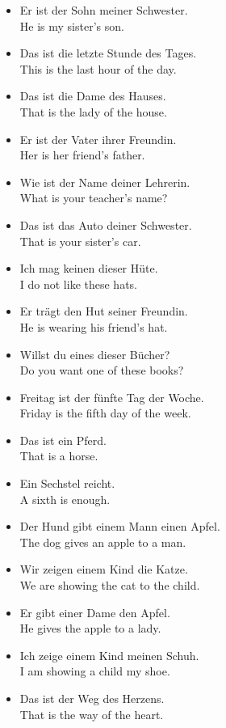 \begin{itemize}
  \item  Er ist der Sohn meiner Schwester. \\ He is my sister's son.
	\item  Das ist die letzte Stunde des Tages. \\ This is the last hour of the day.
	\item  Das ist die Dame des Hauses. \\ That is the lady of the house.
	\item  Er ist der Vater ihrer Freundin. \\ Her is her friend's father.
	\item  Wie ist der Name deiner Lehrerin. \\ What is your teacher's name?
	\item  Das ist das Auto deiner Schwester. \\ That is your sister's car.
	\item  Ich mag keinen dieser H{\"u}te. \\ I do not like these hats.
	\item  Er tr{\"a}gt den Hut seiner Freundin. \\ He is wearing his friend's hat.
	\item  Willst du eines dieser B{\"u}cher? \\ Do you want one of these books?
	\item  Freitag ist der f{\"u}nfte Tag der Woche. \\ Friday is the fifth day of the week.
	\item  Das ist ein Pferd. \\ That is a horse.
	\item  Ein Sechstel reicht. \\ A sixth is enough. \\
	\item  Der Hund gibt einem Mann einen Apfel. \\ The dog gives an apple to a man.
	\item  Wir zeigen einem Kind die Katze. \\ We are showing the cat to the child.
	\item  Er gibt einer Dame den Apfel. \\ He gives the apple to a lady.
	\item  Ich zeige einem Kind meinen Schuh. \\ I am showing a child my shoe.
	\item  Das ist der Weg des Herzens. \\ That is the way of the heart.
\end{itemize}


